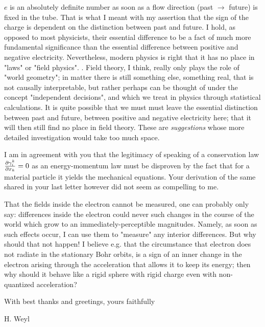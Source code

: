 \begin{letter}{2}
$e$ is an absolutely definite number as soon as a flow direction (past $\to$ future) is fixed in the tube. That is what I meant with my assertion that the sign of the charge is dependent on the distinction between past and future. I hold, as opposed to most physicists, their essential difference to be a fact of much more fundamental significance than the essential difference between positive and negative electricity. Nevertheless, modern physics is right that it has no place in "laws" or "field physics". . Field theory, I think, really only plays the role of "world geometry"; in matter there is still something else, something real, that is not causally interpretable, but rather perhaps can be thought of under the concept "independent decisions", and which we treat in physics through statistical calculations. It is quite possible that we must must leave the essential distinction between past and future, between positive and negative electricity here; that it will then still find no place in field theory. These are \textit{suggestions} whose more detailed investigation would take too much space.

I am in agreement with you that the legitimacy of speaking of a conservation law $\frac{\partial \gamma_i^k}{\partial x_k} = 0$ as an energy-momentum law must be disproven by the fact that for a material particle it yields the mechanical equations. Your derivation of the same shared in your last letter however did not seem as compelling to me.

That the fields inside the electron cannot be measured, one can probably only say: differences inside the electron could never  such changes in the course of the world which grow to an immediately-perceptible magnitudes. Namely, as soon as such effects occur, I can use them to "measure" any interior differences. But why should that not happen! I believe e.g. that the circumstance that electron does not radiate in the stationary Bohr orbits, is a sign of an inner change in the electron arising through the acceleration that allows it to keep its energy; then why should it behave like a rigid sphere with rigid charge even with non-quantized acceleration?

With best thanks and greetings, yours faithfully

H. Weyl



\end{letter}
